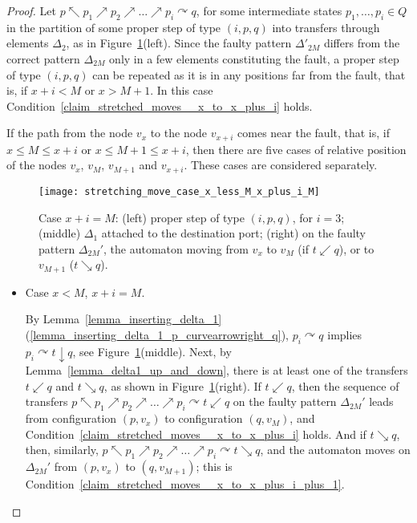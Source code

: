 \documentclass[12pt,a4paper]{article}
\theoremstyle{definition}
\begin{document}
\begin{proof}
Let $p \nwarrow p_1 \nearrow p_2 \nearrow \ldots \nearrow p_i \curvearrowright q$,
for some intermediate states $p_1, \ldots, p_i \in Q$
in the partition of some proper step of type $(i,p,q)$
into transfers through elements $\Delta_2$,
as in Figure~\ref{f:stretching_move_case_x_less_M_x_plus_i_M}(left).
Since the faulty pattern $\Delta'_{2M}$ differs from the correct pattern $\Delta_{2M}$
only in a few elements constituting the fault,
a proper step of type $(i,p,q)$ can be repeated as it is in any positions far from the fault,
that is, if $x+i < M$ or $x>M+1$.
In this case Condition~\ref{claim_stretched_moves__x_to_x_plus_i} holds.

If the path from the node $v_x$ to the node $v_{x+i}$ comes near the fault,
that is, if $x \leqslant M \leqslant x+i$ or $x \leqslant M+1 \leqslant x+i$,
then there are five cases of relative position of the nodes $v_x$, $v_M$, $v_{M+1}$ and $v_{x+i}$.
These cases are considered separately.

\begin{figure}[t]
	\centerline{\texttt{[image: stretching\_move\_case\_x\_less\_M\_x\_plus\_i\_M]}}
	\caption{Case $x+i=M$:
	(left) proper step of type $(i,p,q)$, for $i = 3$;
	(middle) $\Delta_1$ attached to the destination port;
	(right) on the faulty pattern $\Delta_{2M}'$, the automaton moving from $v_x$
	to $v_M$ (if $t \swarrow q$), or to $v_{M+1}$ ($t \searrow q$).}
	\label{f:stretching_move_case_x_less_M_x_plus_i_M}
\end{figure}

\begin{itemize}
\item
	Case $x < M$, $x+i = M$.
	
	By Lemma~\ref{lemma_inserting_delta_1}(\ref{lemma_inserting_delta_1_p_curvearrowright_q}),
	$p_i \curvearrowright q$ implies $p_i \curvearrowright t \downarrow q$,
	see Figure~\ref{f:stretching_move_case_x_less_M_x_plus_i_M}(middle).
	Next, by Lemma~\ref{lemma_delta1_up_and_down},
	there is at least one of the transfers $t \swarrow q$ and $t \searrow q$,
	as shown in Figure~\ref{f:stretching_move_case_x_less_M_x_plus_i_M}(right).
	If $t \swarrow q$,
	then the sequence of transfers
	$p \nwarrow p_1 \nearrow p_2 \nearrow \ldots \nearrow p_i \curvearrowright t \swarrow q$
	on the faulty pattern $\Delta_{2M}'$
	leads from configuration $(p,v_x)$ to configuration $(q,v_{M})$,
	and Condition~\ref{claim_stretched_moves__x_to_x_plus_i} holds.
	And if $t \searrow q$,
	then, similarly,
	$p \nwarrow p_1 \nearrow p_2 \nearrow \ldots \nearrow p_i \curvearrowright t \searrow q$,
	and the automaton moves on $\Delta_{2M}'$ from $(p,v_x)$ to $(q,v_{M+1})$;
	this is Condition~\ref{claim_stretched_moves__x_to_x_plus_i_plus_1}.


\end{itemize}
\end{proof}
\end{document}

